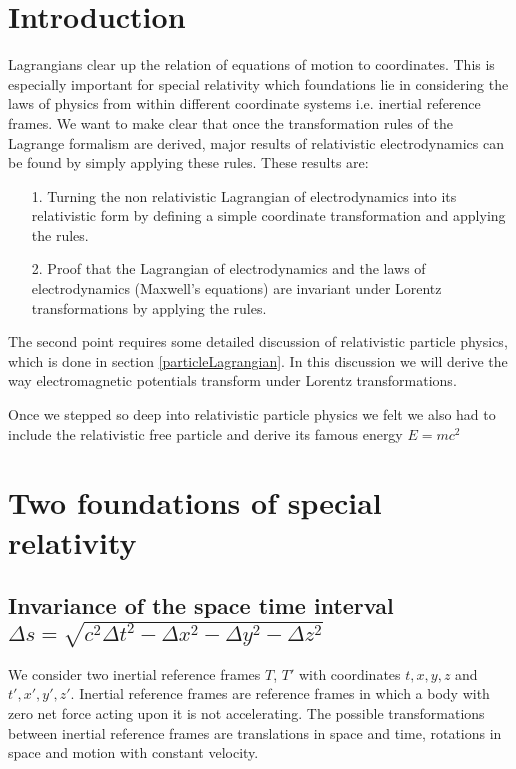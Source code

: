 \documentclass{article}
\begin{document}
\section{Introduction}

Lagrangians clear up the relation of equations of motion to coordinates.
This is especially important for special relativity which foundations lie in considering the laws of physics from within different coordinate systems i.e. inertial reference frames.
We want to make clear that once the transformation rules of the Lagrange formalism are derived, major results of relativistic electrodynamics can be found by simply applying these rules.
These results are:
\begin{itemize}
\item[1.] Turning the non relativistic Lagrangian of electrodynamics into its relativistic form by defining a simple coordinate transformation and applying the rules.
\item[2.] Proof that the Lagrangian of electrodynamics and the laws of electrodynamics (Maxwell's equations) are invariant under Lorentz transformations by applying the rules.
\end{itemize}

The second point requires some detailed discussion of relativistic particle physics, which is done in section \ref{particleLagrangian}.
In this discussion we will derive the way electromagnetic potentials transform under Lorentz transformations.

Once we stepped so deep into relativistic particle physics we felt we also had to include the relativistic free particle and derive its famous energy $E=m c^2$


\section{Two foundations of special relativity} \label{foundations}

\subsection{Invariance of the space time interval \\ $\Delta s = \sqrt{c^2\Delta t^2 - \Delta x^2 - \Delta y^2 - \Delta z^2}$ \cite{LandauInterval}} \label{sectionInvarianceSpaceTime}
We consider two inertial reference frames $T$, $T'$ with coordinates $t,x,y,z$ and $t',x',y',z'$.
Inertial reference frames are reference frames in which a body with zero net force acting upon it is not accelerating.
The possible transformations between inertial reference frames are translations in space and time, rotations in space and motion with constant velocity.
\end{document}
